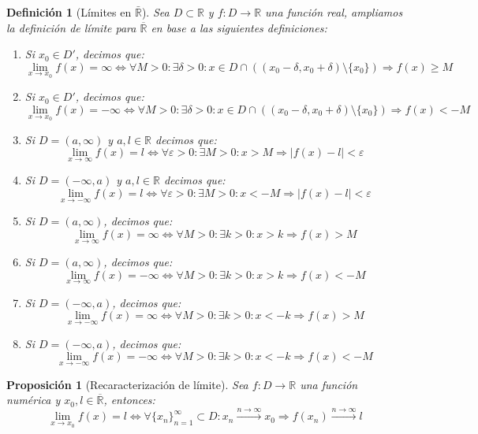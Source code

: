 \documentclass[10pt,a4paper,openright]{book}
\theoremstyle{break}
\newtheorem{defi}{Definición}[chapter]
\newtheorem{prop}{Proposición}[chapter]
\begin{document}
\begin{defi}[Límites en $\bar{\mathbb{R}}$]
Sea $D\subset \mathbb R$ y $f: D\longrightarrow \mathbb R$ una función real, ampliamos la definición de límite para $\overline{\mathbb{R}}$ en base a las siguientes definiciones:
\begin{enumerate}
\item Si $x_0\in D'$, decimos que:
$$\lim_{x\rightarrow x_0}f(x)=\infty\Leftrightarrow\forall M>0: \exists \delta>0: x\in D\cap \left((x_0-\delta, x_0+\delta)\mbox{\textbackslash}\{x_0\}\right)\Rightarrow f(x)\geq M$$

\item Si $x_0\in D'$, decimos que:
$$\lim_{x\rightarrow x_0}f(x)=-\infty \Leftrightarrow\forall M>0: \exists \delta>0: x\in D\cap \left((x_0-\delta, x_0+\delta)\mbox{\textbackslash}\{x_0\}\right)\Rightarrow f(x)<-M$$

\item Si $D=(a, \infty)$ y $a,l\in \mathbb R$ decimos que:
$$\lim_{x\rightarrow \infty}f(x)=l\Leftrightarrow \forall \varepsilon>0: \exists M>0: x>M\Rightarrow |f(x)-l|<\varepsilon$$

\item Si $D=(-\infty, a)$ y $a,l\in \mathbb R$ decimos que:
$$\lim_{x\rightarrow -\infty}f(x)=l\Leftrightarrow \forall \varepsilon>0: \exists M>0: x< -M\Rightarrow |f(x)-l|<\varepsilon$$

\item Si $D=(a,\infty)$, decimos que:
$$\lim_{x\rightarrow \infty}f(x)=\infty \Leftrightarrow \forall M>0: \exists k>0:  x>k \Rightarrow f(x)>M$$

\item Si $D=(a,\infty)$, decimos que:
$$\lim_{x\rightarrow \infty}f(x)=-\infty \Leftrightarrow \forall M>0: \exists k>0:  x>k \Rightarrow f(x)<-M$$

\item Si $D=(-\infty,a)$, decimos que:
$$\lim_{x\rightarrow -\infty}f(x)=\infty \Leftrightarrow \forall M>0: \exists k>0:  x<-k \Rightarrow f(x)>M$$

\item Si $D=(-\infty,a)$, decimos que:
$$\lim_{x\rightarrow -\infty}f(x)=-\infty \Leftrightarrow \forall M>0: \exists k>0:  x<-k \Rightarrow f(x)<-M$$
\end{enumerate}
\end{defi}

\begin{prop}[Recaracterización de límite]
Sea $f:D\rightarrow \mathbb{R}$ una función numérica y $x_0, l\in \overline{\mathbb R}$, entonces:
\[
\lim_{x\rightarrow x_0}f(x)=l\Leftrightarrow \forall\{x_n\}_{n=1}^\infty \subset D: x_n\xrightarrow{n\rightarrow \infty} x_0\Rightarrow f(x_n)\xrightarrow{n\rightarrow \infty} l
\]
\end{prop}
\end{document}
